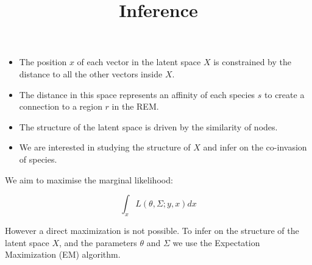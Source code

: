 \documentclass[
	11pt, %
]{beamer}
\begin{document}
\begin{frame}

\begin{itemize}
\item The position $x$ of each vector in the latent space $X$ is constrained by the distance to all the other vectors inside $X$.
\item The distance in this space represents an affinity of each species $s$ to create a connection to a region $r$ in the REM.
\item The structure of the latent space is driven by the similarity of nodes.
\item We are interested in studying the structure of $X$ and infer on the co-invasion of species.
\end{itemize}


\end{frame}

\begin{frame}
\title{Inference}

We aim to maximise the marginal likelihood: 

$$\int_x L(\theta, \Sigma ; y, x) dx$$

\bigskip

However a direct maximization is not possible. To infer on the structure of the latent space $X$, and the parameters $\theta$  and $\Sigma$ we use the Expectation Maximization (EM) algorithm. 
\bigskip

\begin{algorithm}[H]
\end{algorithm}


\end{frame}
\end{document}
